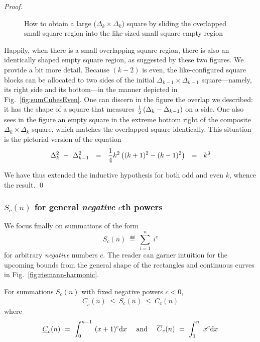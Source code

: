 \begin{proof}
\begin{figure}[hbt]
\begin{center}
\caption{How to obtain a large ($\Delta_k \times \Delta_k$) square by sliding the overlapped small square region into the like-sized small square empty region}
       \label{fig:sumCubesEvenFinal}
\end{center}
\end{figure}
Happily, when there is a small overlapping square region, there is also an identically shaped empty square region, as suggested by these two figures.  We provide a bit more detail.  Because $(k-2)$ is even, the like-configured square blocks can be allocated to two sides of the initial $\Delta_{k-1} \times \Delta_{k-1}$ square---namely, its right side and its bottom---in the manner depicted in Fig.~\ref{fig:sumCubesEven}.  One can discern in the figure the overlap we described: it has the shape of a square that measures  ${1 \over 2} \left( \Delta_k - \Delta_{k-1}\right)$ on a side.  One also sees in the figure an empty square in the extreme bottom right of the composite $\Delta_k \times \Delta_k$ square, which matches the overlapped square identically.  This situation is the pictorial version of the equation
\[ \Delta_k^2 \ - \ \Delta_{k-1}^2 
 \ \ =  \ \ {1 \over 4} k^2 \left( (k+1)^2 - (k-1)^2 \right)  \ \ = \ \ k^3 \]

We have thus extended the inductive hypothesis for both odd and even $k$, whence the
result.  \qed
\end{proof}


\subsubsection{$S_c(n)$ for general {\em negative} $c$th powers}
\label{sec:sum-of-i2c<0}

We focus finally on summations of the form
\[ S_c(n) \ \eqdef \ \sum_{i=1}^n \ i^c \]
for arbitrary {\em negative} numbers $c$.  The reader can garner intuition for the upcoming bounds from the general shape of the rectangles and continuous curves in 
Fig.~\ref{fig:riemann-harmonic}.

\begin{prop}
\label{thm:general-bounds-negative-xc}
For summations $S_c(n)$ with fixed negative powers $c<0$,
\begin{equation} 
\label{eq:general-bounds-negative-xc}
\underline{C}_c(n) \  \leq \ S_c(n) \ \leq \ \overline{C}_c(n)
\end{equation}
where
\[ \underline{C}_c(n) \ = \ \int_0^{n-1} \ (x+1)^c {\rm d}x \ \ \ 
\mbox{ and } \ \ \ 
 \overline{C}_c(n) \ = \ \int_1^n \ x^c {\rm d}x \]
\end{prop}


